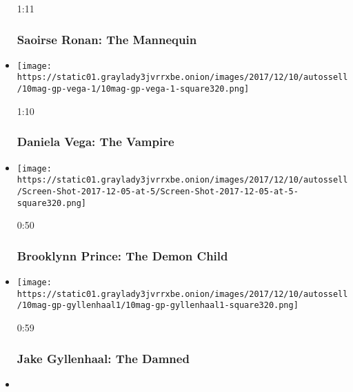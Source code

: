\begin{itemize}
  1:11

  \hypertarget{saoirse-ronan-the-mannequin}{%
  \subsubsection{Saoirse Ronan: The
  Mannequin}\label{saoirse-ronan-the-mannequin}}
\item
  \href{https://www.nytimes3xbfgragh.onion/video/magazine/100000005588930/daniela-vega-the-vampire.html?action=click\&module=video-series-bar\&region=header\&pgtype=Article\&playlistId=video/great-performers}{}

  \texttt{[image: https://static01.graylady3jvrrxbe.onion/images/2017/12/10/autossell/10mag-gp-vega-1/10mag-gp-vega-1-square320.png]}

  1:10

  \hypertarget{daniela-vega-the-vampire}{%
  \subsubsection{Daniela Vega: The
  Vampire}\label{daniela-vega-the-vampire}}
\item
  \href{https://www.nytimes3xbfgragh.onion/video/magazine/100000005588908/brooklynn-prince-the-demon-child.html?action=click\&module=video-series-bar\&region=header\&pgtype=Article\&playlistId=video/great-performers}{}

  \texttt{[image: https://static01.graylady3jvrrxbe.onion/images/2017/12/10/autossell/Screen-Shot-2017-12-05-at-5/Screen-Shot-2017-12-05-at-5-square320.png]}

  0:50

  \hypertarget{brooklynn-prince-the-demon-child}{%
  \subsubsection{Brooklynn Prince: The Demon
  Child}\label{brooklynn-prince-the-demon-child}}
\item
  \href{https://www.nytimes3xbfgragh.onion/video/magazine/100000005588876/jake-gyllenhaal-the-damned.html?action=click\&module=video-series-bar\&region=header\&pgtype=Article\&playlistId=video/great-performers}{}

  \texttt{[image: https://static01.graylady3jvrrxbe.onion/images/2017/12/10/autossell/10mag-gp-gyllenhaal1/10mag-gp-gyllenhaal1-square320.png]}

  0:59

  \hypertarget{jake-gyllenhaal-the-damned}{%
  \subsubsection{Jake Gyllenhaal: The
  Damned}\label{jake-gyllenhaal-the-damned}}
\item
  \href{https://www.nytimes3xbfgragh.onion/video/magazine/100000005588881/tiffany-haddish-the-macabre-dancer.html?action=click\&module=video-series-bar\&region=header\&pgtype=Article\&playlistId=video/great-performers}{}


\end{itemize}
